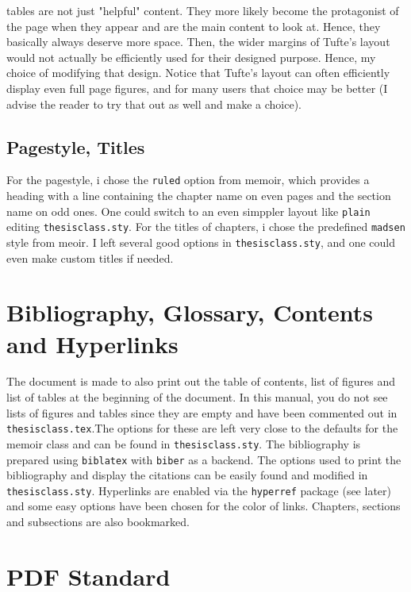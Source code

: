 tables are not just "helpful" content. They more likely become the protagonist of the page when they appear and are the main content to look at. Hence, they basically always deserve more space. Then, the wider margins of Tufte's layout would not actually be efficiently used for their designed purpose. Hence, my choice of modifying that design. Notice that Tufte's layout can often efficiently display even full page figures, and for many users that choice may be better (I advise the reader to try that out as well and make a choice).

\subsection{Pagestyle, Titles}

For the pagestyle, i chose the \texttt{ruled} option from memoir, which provides a heading with a line containing the chapter name on even pages and the section name on odd ones. One could switch to an even simppler layout like \texttt{plain} editing \texttt{thesisclass.sty}. For the titles of chapters, i chose the predefined \texttt{madsen} style from meoir. I left several good options in \texttt{thesisclass.sty}, and one could even make custom titles if needed.

\section{Bibliography, Glossary, Contents and Hyperlinks}

The document is made to also print out the table of contents, list of figures and list of tables at the beginning of the document. In this manual, you do not see lists of figures and tables since they are empty and have been commented out in \texttt{thesisclass.tex}.The options for these are left very close to the defaults for the memoir class and can be found in \texttt{thesisclass.sty}. The bibliography is prepared using \texttt{biblatex} with \texttt{biber} as a backend. The options used to print the bibliography and display the citations can be easily found and modified in \texttt{thesisclass.sty}. Hyperlinks are enabled via the \texttt{hyperref} package (see later) and some easy options have been chosen for the color of links. Chapters, sections and subsections are also bookmarked. 

\section{PDF Standard}

